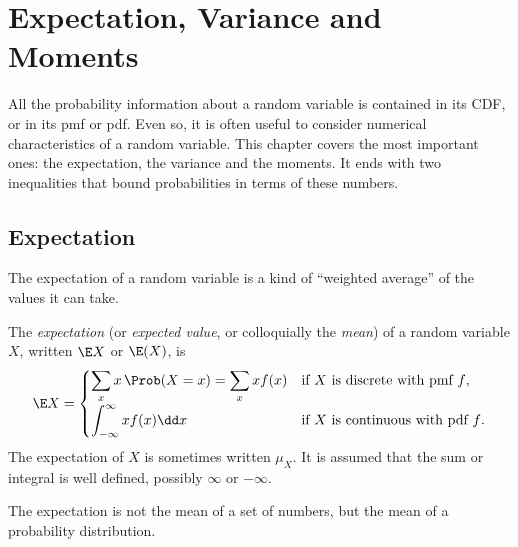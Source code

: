 \chapter{Expectation, Variance and Moments}\label{ch:expectation-moments}



All the probability information about a random variable is contained in its CDF, or in its pmf or pdf. Even so, it is often useful to consider numerical characteristics of a random variable. This chapter covers the most important ones: the expectation, the variance and the moments. It ends with two inequalities that bound probabilities in terms of these numbers.

\section{Expectation}\label{sec:expectation}

The expectation of a random variable is a kind of ``weighted average'' of the values it can take.

\begin{definition}[Expectation]\label{def:expectation}
The \emph{expectation} (or \emph{expected value}, or colloquially the \emph{mean}) of a random variable $X$, written $\E X$ or $\E(X)$, is
\[
  \E X = \begin{cases}
    \displaystyle \sum_x x \, \Prob(X = x) = \sum_x x f(x) & \text{if $X$ is discrete with pmf $f$}, \\[10pt]
    \displaystyle \int_{-\infty}^{\infty} x f(x) \dd x & \text{if $X$ is continuous with pdf $f$}.
  \end{cases}
\]
The expectation of $X$ is sometimes written $\mu_X$. It is assumed that the sum or integral is well defined, possibly $\infty$ or $-\infty$.
\end{definition}

\begin{remark}
The expectation is not the mean of a set of numbers, but the mean of a probability distribution.
\end{remark}

